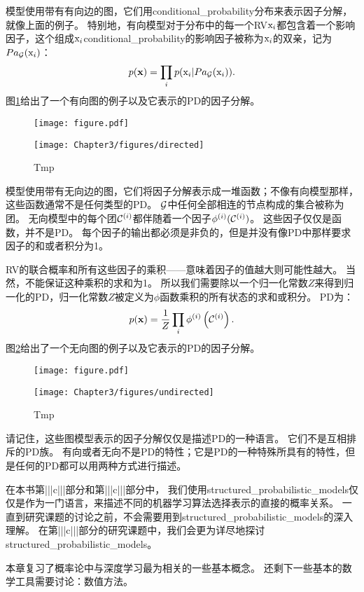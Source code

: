 模型使用带有有向边的图，它们用\gls{conditional_probability}分布来表示因子分解，就像上面的例子。
特别地，有向模型对于分布中的每一个\gls{RV}$\mathrm{x}_i$都包含着一个影响因子，这个组成$\mathrm{x}_i$\gls{conditional_probability}的影响因子被称为$\mathrm{x}_i$的双亲，记为$Pa_{\mathcal{G}}(\mathrm{x}_i)$：
\begin{equation}
p(\mathbf{x}) = \prod_i p(\mathrm{x}_i | Pa_{\mathcal{G}}(\mathrm{x}_i)).
\end{equation}
图\ref{fig:chap3_directed}给出了一个有向图的例子以及它表示的\gls{PD}的因子分解。
\begin{figure}[!htb]
\ifOpenSource
\centerline{\texttt{[image: figure.pdf]}}
\else
\centerline{\texttt{[image: Chapter3/figures/directed]}}
\fi
\caption{Tmp}
\label{fig:chap3_directed}
\end{figure}



模型使用带有无向边的图，它们将因子分解表示成一堆函数；不像有向模型那样，这些函数通常不是任何类型的\gls{PD}。
$\mathcal{G}$中任何全部相连的节点构成的集合被称为团。
无向模型中的每个团$\mathcal{C}^{(i)}$都伴随着一个因子$\phi^{(i)}(\mathcal{C}^{(i)})$。
 这些因子仅仅是函数，并不是\gls{PD}。
 每个因子的输出都必须是非负的，但是并没有像\gls{PD}中那样要求因子的和或者积分为1。

\gls{RV}的联合概率和所有这些因子的乘积——意味着因子的值越大则可能性越大。
当然，不能保证这种乘积的求和为1。
所以我们需要除以一个归一化常数$Z$来得到归一化的\gls{PD}，归一化常数$Z$被定义为$\phi$函数乘积的所有状态的求和或积分。
\gls{PD}为：
\begin{equation}
p(\mathbf{x}) = \frac{1}{Z} \prod_i \phi^{(i)} \left (\mathcal{C}^{(i)} \right).
\end{equation}
图\ref{fig:chap3_undirected}给出了一个无向图的例子以及它表示的\gls{PD}的因子分解。
\begin{figure}[!htb]
\ifOpenSource
\centerline{\texttt{[image: figure.pdf]}}
\else
\centerline{\texttt{[image: Chapter3/figures/undirected]}}
\fi
\caption{Tmp}
\label{fig:chap3_undirected}
\end{figure}



请记住，这些图模型表示的因子分解仅仅是描述\gls{PD}的一种语言。
它们不是互相排斥的\gls{PD}族。
有向或者无向不是\gls{PD}的特性；它是\gls{PD}的一种特殊所具有的特性，但是任何的\gls{PD}都可以用两种方式进行描述。

在本书第|||c|||部分和第|||c|||部分中， 我们使用\gls{structured_probabilistic_models}仅仅是作为一门语言，来描述不同的机器学习算法选择表示的直接的概率关系。
一直到研究课题的讨论之前，不会需要用到\gls{structured_probabilistic_models}的深入理解。
在第|||c|||部分的研究课题中，我们会更为详尽地探讨\gls{structured_probabilistic_models}。

本章复习了概率论中与深度学习最为相关的一些基本概念。
还剩下一些基本的数学工具需要讨论：数值方法。

